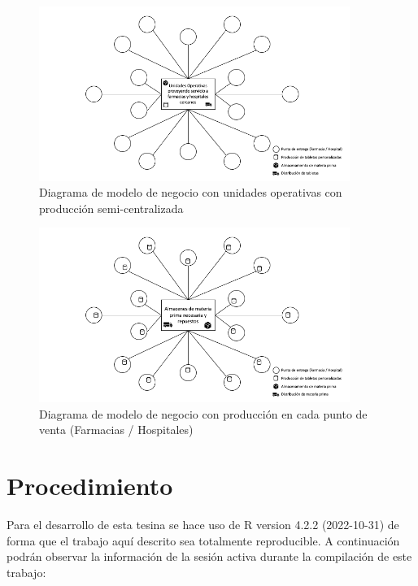 \documentclass[
]{book}
\begin{document}
\begin{figure}
\centering
\includegraphics[width=0.9\textwidth,height=\textheight]{Diagramas/TP_Business_Model_1.png}
\caption{Diagrama de modelo de negocio con unidades operativas con producción
semi-centralizada}
\end{figure}

\begin{figure}
\centering
\includegraphics[width=0.9\textwidth,height=\textheight]{Diagramas/TP_Business_Model_2.png}
\caption{Diagrama de modelo de negocio con producción en cada punto de venta
(Farmacias / Hospitales)}
\end{figure}

\newpage

\hypertarget{procedimiento}{%
\chapter{Procedimiento}\label{procedimiento}}

Para el desarrollo de esta tesina se hace uso de R version 4.2.2 (2022-10-31) de forma que el trabajo aquí descrito sea totalmente reproducible. A continuación podrán observar la información de la sesión activa durante la compilación de este trabajo:
\end{document}
